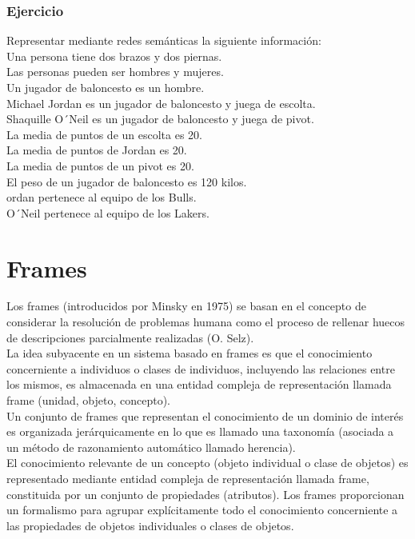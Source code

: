 \documentclass[12pt]{article}
\begin{document}
\subsubsection{Ejercicio}
Representar mediante redes semánticas la siguiente información:\\
Una persona tiene dos brazos y dos piernas.\\
Las personas pueden ser hombres y mujeres.\\
Un jugador de baloncesto es un hombre.\\
Michael Jordan es un jugador de baloncesto y juega de escolta.\\
Shaquille O\'\ Neil es un jugador de baloncesto y juega de pivot.\\
La media de puntos de un escolta es 20.\\
La media de puntos de Jordan es 20.\\
La media de puntos de un pivot es 20.\\
El peso de un jugador de baloncesto es 120 kilos.\\
ordan pertenece al equipo de los Bulls.\\
O\'\ Neil pertenece al equipo de los Lakers.\\

\section{Frames}
Los frames (introducidos por Minsky en 1975) se basan en el concepto de considerar la resolución de problemas humana como el proceso de rellenar huecos de descripciones parcialmente realizadas (O. Selz).\\
La idea subyacente en un sistema basado en frames es que el conocimiento concerniente a individuos o clases de individuos, incluyendo las relaciones entre los mismos, es almacenada en una entidad compleja de representación llamada frame (unidad, objeto, concepto).\\
Un conjunto de frames que representan el conocimiento de un dominio de interés es organizada jerárquicamente en lo que es llamado una taxonomía (asociada a un método de razonamiento automático llamado herencia).\\

El conocimiento relevante de un concepto (objeto individual o clase de objetos) es representado mediante entidad compleja de representación llamada frame, constituida por un conjunto de propiedades (atributos). Los frames proporcionan un formalismo para agrupar explícitamente todo el conocimiento concerniente a las propiedades de objetos individuales o clases de objetos.\\
\end{document}
